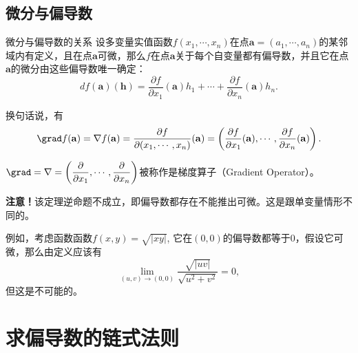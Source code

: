 \subsection{微分与偏导数}


\begin{frame}

\begin{block}{微分与偏导数的关系}
设多变量实值函数$f(x_1,\cdots,x_n)$在点$\mathbf{a} = (a_1,\cdots,a_n)$的某邻域内有定义，且在点$\mathbf{a}$可微，那么$f$在点$\mathbf{a}$关于每个自变量都有偏导数，并且它在点$\mathbf{a}$的微分由这些偏导数唯一确定：
\[df(\mathbf{a})(\mathbf{h}) = \dfrac{\partial f}{\partial x_1}(\mathbf{a})h_1 + \cdots + \dfrac{\partial f}{\partial x_n}(\mathbf{a})h_n.\]

\pause

换句话说，有
\begin{align*}
\grad f(\mathbf{a}) = \nabla f(\mathbf{a}) = \dfrac{\partial f}{\partial(x_1,\cdots,x_n)}(\mathbf{a})  = \left(\dfrac{\partial f}{\partial x_1} ( \mathbf{a}), \cdots, \dfrac{\partial f}{\partial x_n}(\mathbf{a}) \right).
\end{align*}

\pause
\(\displaystyle \grad = \nabla = \left(\dfrac{\partial}{\partial x_1}, \cdots, \dfrac{\partial}{\partial x_n} \right)\)被称作是梯度算子（Gradient Operator）。
\end{block}

\end{frame}


\begin{frame}

{\bfseries 注意！}该定理逆命题不成立，即偏导数都存在不能推出可微。这是跟单变量情形不同的。

\pause

例如，考虑函数函数\(\displaystyle f(x,y) = \sqrt{|xy|}\), 它在$(0,0)$的偏导数都等于$0$，假设它可微，那么由定义应该有
\[\lim\limits_{(u,v)\to(0,0)} \dfrac{\sqrt{|uv|}}{\sqrt{u^2+v^2}} = 0,\]
但这是不可能的。

\end{frame}


\section{求偏导数的链式法则}

